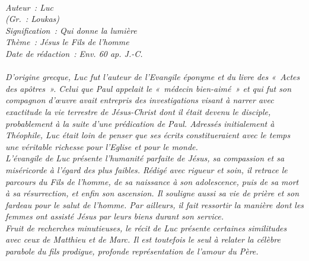 \BFont
\noindent\hrulefill
{\footnotesize
\textit{
\bigskip
{\centering{}
\\Auteur~: Luc
\\(Gr.~: Loukas)
\\Signification~: Qui donne la lumière
\\Thème~: Jésus le Fils de l'homme
\\Date de rédaction~: Env. 60 ap. J.-C.\\}
}
\textit{
\\D'origine grecque, Luc fut l'auteur de l'Evangile éponyme et du livre des «~Actes des apôtres~». Celui que Paul appelait le «~médecin bien-aimé~» et qui fut son compagnon d'œuvre avait entrepris des investigations visant à narrer avec exactitude la vie terrestre de Jésus-Christ dont il était devenu le disciple, probablement à la suite d'une prédication de Paul. Adressés initialement à Théophile, Luc était loin de penser que ses écrits constitueraient avec le temps une véritable richesse pour l'Eglise et pour le monde.
\\L'évangile de Luc présente l'humanité parfaite de Jésus, sa compassion et sa miséricorde à l'égard des plus faibles. Rédigé avec rigueur et soin, il retrace le parcours du Fils de l'homme, de sa naissance à son adolescence, puis de sa mort à sa résurrection, et enfin son ascension. Il souligne aussi sa vie de prière et son fardeau pour le salut de l'homme. Par ailleurs, il fait ressortir la manière dont les femmes ont assisté Jésus par leurs biens durant son service.
\\Fruit de recherches minutieuses, le récit de Luc présente certaines similitudes avec ceux de Matthieu et de Marc. Il est toutefois le seul à relater la célèbre parabole du fils prodigue, profonde représentation de l'amour du Père.\bigskip
}
}
\par\nobreak\noindent\hrulefill
